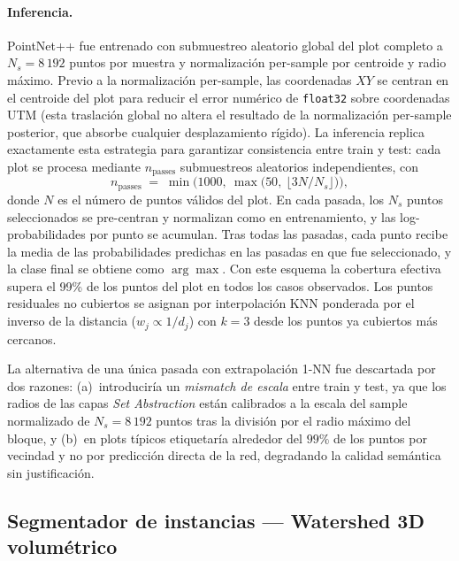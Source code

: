 \documentclass[runningheads]{llncs}
\begin{document}
\paragraph{Inferencia.}
PointNet++ fue entrenado con submuestreo aleatorio global del plot completo a $N_s = 8\,192$ puntos por muestra y normalizaci\'on per-sample por centroide y radio m\'aximo. Previo a la normalizaci\'on per-sample, las coordenadas $XY$ se centran en el centroide del plot para reducir el error num\'erico de \texttt{float32} sobre coordenadas UTM (esta traslaci\'on global no altera el resultado de la normalizaci\'on per-sample posterior, que absorbe cualquier desplazamiento r\'igido). La inferencia replica exactamente esta estrategia para garantizar consistencia entre train y test: cada plot se procesa mediante $n_{\text{passes}}$ submuestreos aleatorios independientes, con
\begin{equation}
  n_{\text{passes}} \;=\; \min\!\bigl(1000,\ \max\!\bigl(50,\ \lfloor 3 N / N_s \rfloor\bigr)\bigr),
\end{equation}
donde $N$ es el n\'umero de puntos v\'alidos del plot. En cada pasada, los $N_s$ puntos seleccionados se pre-centran y normalizan como en entrenamiento, y las log-probabilidades por punto se acumulan. Tras todas las pasadas, cada punto recibe la media de las probabilidades predichas en las pasadas en que fue seleccionado, y la clase final se obtiene como $\arg\max$. Con este esquema la cobertura efectiva supera el 99\% de los puntos del plot en todos los casos observados. Los puntos residuales no cubiertos se asignan por interpolaci\'on KNN ponderada por el inverso de la distancia ($w_j \propto 1/d_j$) con $k = 3$ desde los puntos ya cubiertos m\'as cercanos.

La alternativa de una \'unica pasada con extrapolaci\'on 1-NN fue descartada por dos razones: (a)~introducir\'ia un \emph{mismatch de escala} entre train y test, ya que los radios de las capas \emph{Set Abstraction} est\'an calibrados a la escala del sample normalizado de $N_s = 8\,192$ puntos tras la divisi\'on por el radio m\'aximo del bloque, y (b)~en plots t\'ipicos etiquetar\'ia alrededor del $99\%$ de los puntos por vecindad y no por predicci\'on directa de la red, degradando la calidad sem\'antica sin justificaci\'on.

\subsection{Segmentador de instancias --- Watershed 3D volum\'etrico}\label{sec:watershed}
\end{document}
